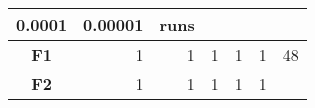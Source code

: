 \documentclass[12pt,a4paper]{article}
\begin{document}
\begin{longtable}[c]{@{}crrrrrr@{}}
\begin{minipage}[b]{0.10\columnwidth}
0.0001
\strut\end{minipage} &
\begin{minipage}[b]{0.11\columnwidth}\raggedleft\strut
0.00001
\strut\end{minipage} &
\begin{minipage}[b]{0.07\columnwidth}\raggedleft\strut
runs
\strut\end{minipage}\tabularnewline
\midrule
\endhead
\begin{minipage}[t]{0.11\columnwidth}\centering\strut
\textbf{F1}
\strut\end{minipage} &
\begin{minipage}[t]{0.07\columnwidth}\raggedleft\strut
1
\strut\end{minipage} &
\begin{minipage}[t]{0.08\columnwidth}\raggedleft\strut
1
\strut\end{minipage} &
\begin{minipage}[t]{0.09\columnwidth}\raggedleft\strut
1
\strut\end{minipage} &
\begin{minipage}[t]{0.10\columnwidth}\raggedleft\strut
1
\strut\end{minipage} &
\begin{minipage}[t]{0.11\columnwidth}\raggedleft\strut
1
\strut\end{minipage} &
\begin{minipage}[t]{0.07\columnwidth}\raggedleft\strut
48
\strut\end{minipage}\tabularnewline
\begin{minipage}[t]{0.11\columnwidth}\centering\strut
\textbf{F2}
\strut\end{minipage} &
\begin{minipage}[t]{0.07\columnwidth}\raggedleft\strut
1
\strut\end{minipage} &
\begin{minipage}[t]{0.08\columnwidth}\raggedleft\strut
1
\strut\end{minipage} &
\begin{minipage}[t]{0.09\columnwidth}\raggedleft\strut
1
\strut\end{minipage} &
\begin{minipage}[t]{0.10\columnwidth}\raggedleft\strut
1
\strut\end{minipage} &
\begin{minipage}[t]{0.11\columnwidth}\raggedleft\strut
1
\strut\end{minipage} &
\begin{minipage}[t]{0.07\columnwidth}\raggedleft\strut

\end{minipage}
\end{longtable}
\end{document}
